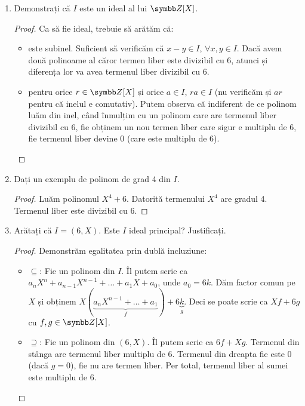 \begin{enumerate}
    \item Demonstrați că \(I\) este un ideal al lui \(\integers[X]\).
    \begin{proof}
    Ca să fie ideal, trebuie să arătăm că:
    \begin{itemize}
        \item este subinel. Suficient să verificăm că \(x - y \in I\), \(\forall x, y \in I\). Dacă avem două polinoame al căror termen liber este divizibil cu 6, atunci și diferența lor va avea termenul liber divizibil cu 6.

        \item pentru orice \(r \in \integers[X]\) și orice \(a \in I\), \(ra \in I\) (nu verificăm și \(ar\) pentru că inelul e comutativ). Putem observa că indiferent de ce polinom luăm din inel, când înmulțim cu un polinom care are termenul liber divizibil cu 6, fie obținem un nou termen liber care sigur e multiplu de 6, fie termenul liber devine 0 (care este multiplu de 6).
    \end{itemize}
    \end{proof}

    \item Dați un exemplu de polinom de grad 4 din \(I\).
    \begin{proof}
    Luăm polinomul \(X^4 + 6\). Datorită termenului \(X^4\) are gradul 4. Termenul liber este divizibil cu 6.
    \end{proof}

    \item Arătați că \(I = (6, X)\). Este \(I\) ideal principal? Justificați.
    \begin{proof}
    Demonstrăm egalitatea prin dublă incluziune:
    \begin{itemize}
        \item \(\subseteq\): Fie un polinom din \(I\). Îl putem scrie ca \(a_n X^n + a_{n-1} X^{n-1} + \dots + a_1 X + a_0\), unde \(a_0 = 6 k\). Dăm factor comun pe \(X\) și obținem \(X (\underbrace{a_n X^{n - 1} + \dots + a_1}_{f}) + 6 \underbrace{k}_{g}\). Deci se poate scrie ca \(X f + 6 g\) cu \(f, g \in \integers[X]\).
        \item \(\supseteq\): Fie un polinom din \((6, X)\). Îl putem scrie ca \(6 f + X g\).  Termenul din stânga are termenul liber multiplu de 6. Termenul din dreapta fie este 0 (dacă \(g = 0\)), fie nu are termen liber. Per total, termenul liber al sumei este multiplu de 6.
    \end{itemize}


\end{proof}
\end{enumerate}

